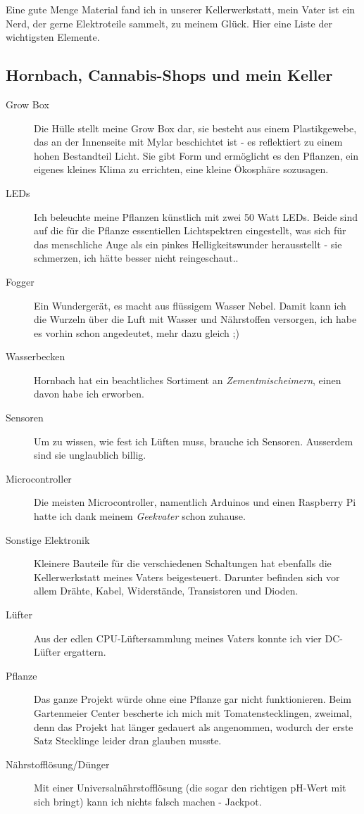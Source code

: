 \documentclass[12pt,titlepage,a4paper]{article}
\begin{document}
Eine gute Menge Material fand ich in unserer Kellerwerkstatt, mein Vater ist ein Nerd, der gerne Elektroteile sammelt, zu meinem Glück. Hier eine Liste der wichtigsten Elemente.

\subsection{Hornbach, Cannabis-Shops und mein Keller}
\begin{description}
\item[Grow Box] Die Hülle stellt meine Grow Box dar, sie besteht aus einem Plastikgewebe, das an der Innenseite mit Mylar beschichtet ist - es reflektiert zu einem hohen Bestandteil Licht. Sie gibt Form und ermöglicht es den Pflanzen, ein eigenes kleines Klima zu errichten, eine kleine Ökosphäre sozusagen.
\item[LEDs] Ich beleuchte meine Pflanzen künstlich mit zwei 50 Watt LEDs. Beide sind auf die für die Pflanze essentiellen Lichtspektren eingestellt, was sich für das menschliche Auge als ein pinkes Helligkeitswunder herausstellt - sie schmerzen, ich hätte besser nicht reingeschaut..
\item[Fogger] Ein Wundergerät, es macht aus flüssigem Wasser Nebel. Damit kann ich die Wurzeln über die Luft mit Wasser und Nährstoffen versorgen, ich habe es vorhin schon angedeutet, mehr dazu gleich ;)
\item[Wasserbecken] Hornbach hat ein beachtliches Sortiment an \textit{Zementmischeimern}, einen davon habe ich erworben.
\item[Sensoren] Um zu wissen, wie fest ich Lüften muss, brauche ich Sensoren. Ausserdem sind sie unglaublich billig.
\item[Microcontroller] Die meisten Microcontroller, namentlich Arduinos und einen Raspberry Pi hatte ich dank meinem \textit{Geekvater} schon zuhause.
\item[Sonstige Elektronik] Kleinere Bauteile für die verschiedenen Schaltungen hat ebenfalls die Kellerwerkstatt meines Vaters beigesteuert. Darunter befinden sich vor allem Drähte, Kabel, Widerstände,  Transistoren und Dioden.
\item[Lüfter] Aus der edlen CPU-Lüftersammlung meines Vaters konnte ich vier DC-Lüfter ergattern.
\item[Pflanze] Das ganze Projekt würde ohne eine Pflanze gar nicht funktionieren. Beim Gartenmeier Center bescherte ich mich mit Tomatenstecklingen, zweimal, denn das Projekt hat länger gedauert als angenommen, wodurch der erste Satz Stecklinge leider dran glauben musste.
\item[Nährstofflösung/Dünger] Mit einer Universalnährstofflösung (die sogar den richtigen pH-Wert mit sich bringt) kann ich nichts falsch machen - Jackpot.
\end{description}
\end{document}
